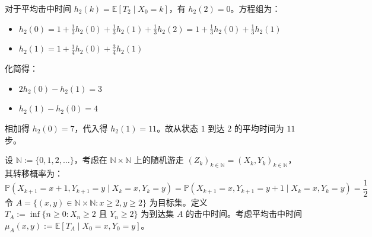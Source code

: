\begin{questions}
\begin{parts}
\begin{solution}
        对于平均击中时间 $h_2(k) = \mathbb{E}[T_2 \mid X_0 = k]$，有 $h_2(2) = 0$。方程组为：
        \begin{itemize}
            \item $h_2(0) = 1 + \frac{1}{3}h_2(0) + \frac{1}{3}h_2(1) + \frac{1}{3}h_2(2) = 1 + \frac{1}{3}h_2(0) + \frac{1}{3}h_2(1)$
            \item $h_2(1) = 1 + \frac{1}{4}h_2(0) + \frac{3}{4}h_2(1)$
        \end{itemize}
        化简得：
        \begin{itemize}
            \item $2h_2(0) - h_2(1) = 3$
            \item $h_2(1) - h_2(0) = 4$
        \end{itemize}
        相加得 $h_2(0) = 7$，代入得 $h_2(1) = 11$。故从状态 $1$ 到达 $2$ 的平均时间为 $11$ 步。
    \end{solution}
\end{parts}

\question 设 $\mathbb{N} := \{0, 1, 2, \dots\}$，考虑在 $\mathbb{N} \times \mathbb{N}$ 上的随机游走 $(Z_k)_{k \in \mathbb{N}} = (X_k, Y_k)_{k \in \mathbb{N}}$，其转移概率为：
\[ \mathbb{P}(X_{k+1} = x+1, Y_{k+1} = y \mid X_k = x, Y_k = y) = \mathbb{P}(X_{k+1} = x, Y_{k+1} = y+1 \mid X_k = x, Y_k = y) = \frac{1}{2} \]
令 $A = \{(x, y) \in \mathbb{N} \times \mathbb{N} : x \geqslant 2, y \geqslant 2\}$ 为目标集。定义 $T_A := \inf\{n \geqslant 0 : X_n \geqslant 2 \text{ 且 } Y_n \geqslant 2\}$ 为到达集 $A$ 的击中时间。考虑平均击中时间 $\mu_A(x, y) := \mathbb{E}[T_A \mid X_0 = x, Y_0 = y]$。

\end{questions}
